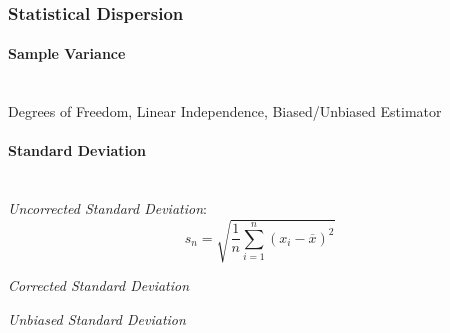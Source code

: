\subsubsection{Statistical Dispersion}\label{sec:statistical_dispersion}

\paragraph{Sample Variance}\label{sec:variability}
\hfill \\

Degrees of Freedom, Linear Independence, Biased/Unbiased Estimator %



\paragraph{Standard Deviation}\label{sec:standard_deviation}
\hfill \\

\emph{Uncorrected Standard Deviation}:
\[
  s_n = \sqrt{\frac{1}{n}\sum_{i=1}^n (x_i - \overline{x})^2}
\]

\emph{Corrected Standard Deviation}

\emph{Unbiased Standard Deviation}
